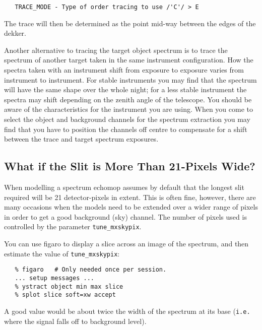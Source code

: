 \documentclass[twoside,11pt]{article}
\newcommand{\xref}[3]{#1}
\newcommand{\xlabel}[1]{}
\newcommand{\mlabel}[1]{\xlabel{#1}\label{#1}}
\newcommand{\scspec}[2]{#1}
\newcommand{\scspec}[2]{#2}
\begin{document}
{
\scspec{\small}{ }
\begin{verbatim}
   TRACE_MODE - Type of order tracing to use /'C'/ > E
\end{verbatim}
}

The trace will then be determined as the point mid-way between the
edges of the dekker.

Another alternative to tracing the target object spectrum is to trace the
spectrum of another target taken in the same instrument configuration.
How the spectra taken with an instrument shift from exposure to exposure
varies from instrument to instrument.  For stable instruments you may
find that the spectrum will have the same shape over the whole night;
for a less stable instrument the spectra may shift depending on the zenith
angle of the telescope.  You should be aware of the characteristics for the
instrument you are using.  When you come to select the object and background
channels for the spectrum extraction you may find that you have to position
the channels off centre to compensate for a shift between the trace and
target spectrum exposures.


\subsection{\mlabel{cook_wide_slit}What if the Slit is More Than
            21-Pixels Wide?}

When modelling a spectrum \xref{{\sc echomop}}{sun152}{} assumes by default
that the longest slit required will be 21 detector-pixels in extent.
This is often fine, however, there are many occasions when the models
need to be extended over a wider range of pixels in order to get a good
background (sky) channel.  The number of pixels used is controlled
by the parameter \xref{{\tt tune\_mxskypix}}{sun152}{par_TUNE_MXSKYPIX}\@.

You can use \xref{{\sc figaro}}{sun86}{} to display a slice across an image
of the spectrum,
and then estimate the value of \verb+tune_mxskypix+:

{
\scspec{\small}{ }
\begin{verbatim}
   % figaro   # Only needed once per session.
   ... setup messages ...
   % ystract object min max slice
   % splot slice soft=xw accept
\end{verbatim}
}

A good value would be about twice the width of the spectrum at its base
({\tt{i.e.\ }} where the signal falls off to background level).
\end{document}
